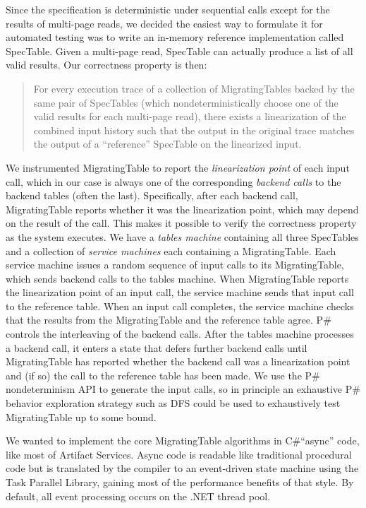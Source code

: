 \documentclass{sig-alternate}
\newcommand{\psharp}{P\#\xspace}
\newcommand{\csharp}{C\#\xspace}
\begin{document}
Since the specification is deterministic under sequential calls except for the results of multi-page reads, we decided the easiest way to formulate it for automated testing was to write an in-memory reference implementation called SpecTable.  Given a multi-page read, SpecTable can actually produce a list of all valid results.  Our correctness property is then:
\begin{quote}
For every execution trace of a collection of MigratingTables backed by the same pair of SpecTables (which nondeterministically choose one of the valid results for each multi-page read), there exists a linearization of the combined input history such that the output in the original trace matches the output of a ``reference'' SpecTable on the linearized input.
\end{quote}
%
\def\term#1{\emph{#1}}
We instrumented MigratingTable to report the \term{linearization point} of each input call, which in our case is always one of the corresponding \term{backend calls} to the backend tables (often the last).  Specifically, after each backend call, MigratingTable reports whether it was the linearization point, which may depend on the result of the call.  This makes it possible to verify the correctness property as the system executes.  We have a \term{tables machine} containing all three SpecTables and a collection of \term{service machines} each containing a MigratingTable.  Each service machine issues a random sequence of input calls to its MigratingTable, which sends backend calls to the tables machine.  When MigratingTable reports the linearization point of an input call, the service machine sends that input call to the reference table.  When an input call completes, the service machine checks that the results from the MigratingTable and the reference table agree.  \psharp controls the interleaving of the backend calls.  After the tables machine processes a backend call, it enters a state that defers further backend calls until MigratingTable has reported whether the backend call was a linearization point and (if so) the call to the reference table has been made.  We use the \psharp nondeterminism API to generate the input calls, so in principle an exhaustive \psharp behavior exploration strategy such as DFS could be used to exhaustively test MigratingTable up to some bound.

We wanted to implement the core MigratingTable algorithms in \csharp ``async'' code, like most of Artifact Services.  Async code is readable like traditional procedural code but is translated by the compiler to an event-driven state machine using the Task Parallel Library, gaining most of the performance benefits of that style.  By default, all event processing occurs on the .NET thread pool.
\end{document}

